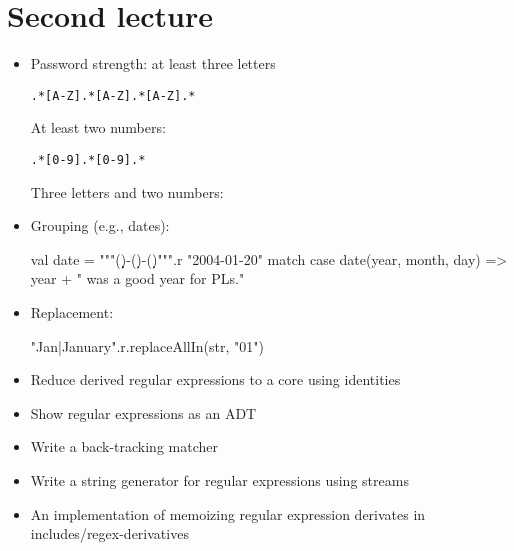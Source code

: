 \newlecture

\section{Second lecture}

\begin{itemize}

\item Password strength: at least three letters

\begin{verbatim}
.*[A-Z].*[A-Z].*[A-Z].*
\end{verbatim}

At least two numbers:

\begin{verbatim}
.*[0-9].*[0-9].*
\end{verbatim}

Three letters and two numbers:

\item Grouping (e.g., dates):

\begin{scalacode}
    val date = """(\d\d\d\d)-(\d\d)-(\d\d)""".r
    "2004-01-20" match {
      case date(year, month, day) => year + " was a good year for PLs."
    }
\end{scalacode}

\item Replacement:

\begin{scalacode}
"Jan|January".r.replaceAllIn(str, "01")
\end{scalacode}

\item Reduce derived regular expressions to a core using identities

\item Show regular expressions as an ADT

\item Write a back-tracking matcher

\item Write a string generator for regular expressions using streams

\item An implementation of memoizing regular expression derivates in includes/regex-derivatives

\end{itemize}
